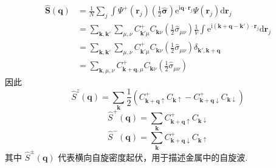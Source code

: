 \begin{equation}
\begin{aligned}
  \hat{\boldsymbol{S}}(\boldsymbol{q})
  &=\frac{1}{N}\sum_{j}\int\Psi^{+}(\boldsymbol{r}_{j})
  \left(\frac{1}{2}\hat{\boldsymbol{\sigma}}\right)
  \mathrm{e}^{\mathrm{i}\boldsymbol{q}\cdot\boldsymbol{r}_{j}}
  \Psi(\boldsymbol{r}_{j})\mathrm{d}\boldsymbol{r}_{j}\\
  &=\sum_{\boldsymbol{k},\boldsymbol{k}'}\sum_{\mu,\nu}
  C^{+}_{\boldsymbol{k}'\mu}C_{\boldsymbol{k}\nu}
  \left(\frac{1}{2}\hat{\sigma}_{\mu\nu}\right)
  \frac{1}{V}\int\mathrm{e}^{\mathrm{i}(\boldsymbol{k}
  +\boldsymbol{q}-\boldsymbol{k}')\cdot\boldsymbol{r}_{j}}
  \mathrm{d}\boldsymbol{r}_{j}\\
  &=\sum_{\boldsymbol{k},\boldsymbol{k}'}\sum_{\mu,\nu}
  C^{+}_{\boldsymbol{k}'\mu}C_{\boldsymbol{k}\nu}
  \left(\frac{1}{2}\hat{\sigma}_{\mu\nu}\right)
  \delta_{\boldsymbol{k}',\boldsymbol{k}+\boldsymbol{q}}\\
  &=\sum_{\boldsymbol{k},\mu,\nu}
  C^{+}_{\boldsymbol{k}+\boldsymbol{q},\mu}
  C_{\boldsymbol{k}\nu}
  \left(\frac{1}{2}\hat{\sigma}_{\mu\nu}\right)
\end{aligned}
\end{equation}
因此
\begin{equation}
  \hat{S}^{z}(\boldsymbol{q})=\sum_{\boldsymbol{k}}
  \frac{1}{2}\left(C^{+}_{\boldsymbol{k}+\boldsymbol{q}\uparrow}
  C_{\boldsymbol{k}\uparrow}
  -C^{+}_{\boldsymbol{k}+\boldsymbol{q}\downarrow}
  C_{\boldsymbol{k}\downarrow}\right)
\end{equation}
\begin{equation}
  \hat{S}^{+}(\boldsymbol{q})=\sum_{\boldsymbol{k}}
  C^{+}_{\boldsymbol{k}+\boldsymbol{q}\uparrow}
  C_{\boldsymbol{k}\downarrow}
\end{equation}
\begin{equation}
  \hat{S}^{-}(\boldsymbol{q})=\sum_{\boldsymbol{k}}
  C^{+}_{\boldsymbol{k}+\boldsymbol{q}\downarrow}
  C_{\boldsymbol{k}\uparrow}
\end{equation}
其中 $\hat{S}^{\pm}(\boldsymbol{q})$ 代表横向自旋密度起伏，用于描述金属中的自旋波.
